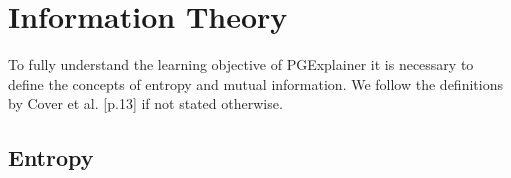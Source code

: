 
\section{Information Theory}
\label{sec:information_theory}
To fully understand the learning objective of PGExplainer it is necessary to define the concepts of entropy and mutual information. We follow the definitions by Cover et al. \cite{Cover2005}[p.13] if not stated otherwise.

\subsection{Entropy}

